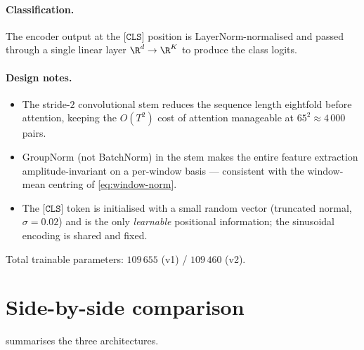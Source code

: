 \paragraph{Classification.}
The encoder output at the $\texttt{[CLS]}$ position is
LayerNorm-normalised and passed through a single linear layer
$\R^{d} \to \R^{K}$ to produce the class logits.

\paragraph{Design notes.}
\begin{itemize}[leftmargin=*, itemsep=0.2em]
    \item The stride-$2$ convolutional stem reduces the sequence length
    eightfold before attention, keeping the $O(T^2)$ cost of attention
    manageable at $65^2 \approx 4\,000$ pairs.
    \item GroupNorm (not BatchNorm) in the stem makes the entire
    feature extraction amplitude-invariant on a per-window basis ---
    consistent with the window-mean centring of \cref{eq:window-norm}.
    \item The $\texttt{[CLS]}$ token is initialised with a small random
    vector (truncated normal, $\sigma = 0.02$) and is the only
    \emph{learnable} positional information; the sinusoidal encoding
    is shared and fixed.
\end{itemize}

Total trainable parameters: $109\,655$ (v1) / $109\,460$ (v2).

\section{Side-by-side comparison}
\label{sec:archi-compare}

 summarises the three architectures.

